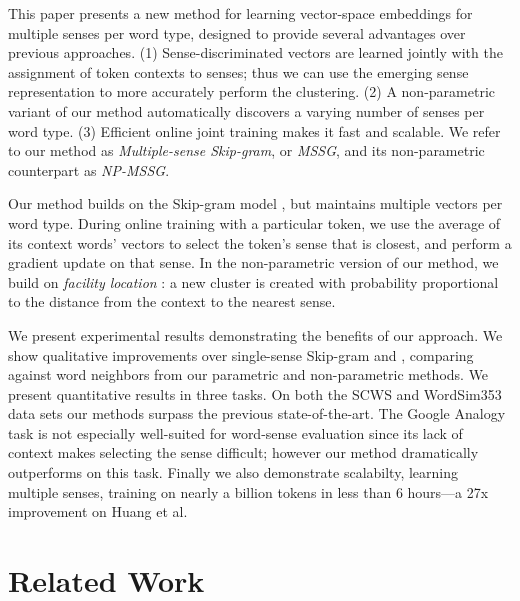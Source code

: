 \documentclass[11pt,a4paper]{article}
\begin{document}

This paper presents a new method for learning vector-space embeddings
for multiple senses per word type, designed to provide several
advantages over previous approaches.  (1) Sense-discriminated vectors
are learned jointly with the assignment of token contexts to senses;
thus we can use the emerging sense representation to more accurately
perform the clustering.  (2) A non-parametric variant of our method
automatically discovers a varying number of senses per word type.  (3)
Efficient online joint training makes it fast and scalable.
We refer to our method as {\it Multiple-sense Skip-gram}, or {\it
  MSSG}, and its non-parametric counterpart as {\it NP-MSSG}.


Our method builds on the Skip-gram model \cite{mikolov:2013a}, but
maintains multiple vectors per word type.  During online training with a
particular token, we use the average of its context words' vectors to
select the token's sense that is closest, and perform a gradient
update on that sense. In the non-parametric version of our method,
we build on {\it facility location} \cite{Meyerson:2001}: a new cluster is
created with probability proportional to the distance from the context
to the nearest sense.

We present experimental results demonstrating the benefits of our
approach.  We show qualitative improvements over single-sense
Skip-gram and , comparing against word neighbors from
our parametric and non-parametric methods.  We present quantitative
results in three tasks.  On both the SCWS and WordSim353 data sets our
methods surpass the previous state-of-the-art.  The Google Analogy
task is not especially well-suited for word-sense evaluation since its
lack of context makes selecting the sense difficult; however
our method dramatically outperforms  on this task.
Finally we also demonstrate scalabilty, learning multiple senses,
training on nearly a billion tokens in less than 6 hours---a 27x improvement on
Huang et al.


\section{Related Work}
\label{sec:related-work}
\end{document}
